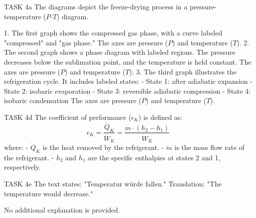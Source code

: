 TASK 4a  
The diagrams depict the freeze-drying process in a pressure-temperature (\(P\)-\(T\)) diagram.  

1. The first graph shows the compressed gas phase, with a curve labeled "compressed" and "gas phase." The axes are pressure (\(P\)) and temperature (\(T\)).  
2. The second graph shows a phase diagram with labeled regions. The pressure decreases below the sublimation point, and the temperature is held constant. The axes are pressure (\(P\)) and temperature (\(T\)).  
3. The third graph illustrates the refrigeration cycle. It includes labeled states:  
   - State 1: after adiabatic expansion  
   - State 2: isobaric evaporation  
   - State 3: reversible adiabatic compression  
   - State 4: isobaric condensation  
   The axes are pressure (\(P\)) and temperature (\(T\)).  

TASK 4d  
The coefficient of performance (\(\epsilon_K\)) is defined as:  
\[
\epsilon_K = \frac{\dot{Q}_K}{\dot{W}_K} = \frac{\dot{m} \cdot (h_2 - h_1)}{\dot{W}_K}
\]  
where:  
- \(\dot{Q}_K\) is the heat removed by the refrigerant.  
- \(\dot{m}\) is the mass flow rate of the refrigerant.  
- \(h_2\) and \(h_1\) are the specific enthalpies at states 2 and 1, respectively.  

TASK 4e  
The text states:  
"Temperatur würde fallen."  
Translation: "The temperature would decrease."  

No additional explanation is provided.
